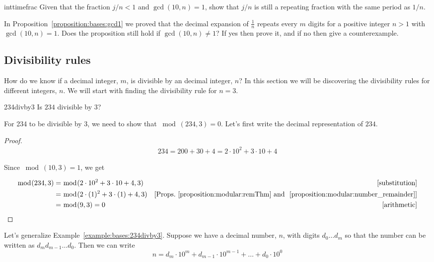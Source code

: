 \begin{exercise}{inttimefrac}
 Given that the fraction $j/n < 1$ and $\gcd(10,n)=1$, show that $j/n$  is still a repeating fraction with the same period as $1/n$.
\end{exercise}

\begin{exercise}{}
In Proposition~\ref{proposition:bases:gcd1} we proved that the decimal expansion of $\frac{1}{n}$ repeats every $m$ digits for a positive integer $n>1$ with 
$\gcd(10,n)=1$. Does the proposition still hold if $\gcd(10,n)\neq 1$? If yes then prove it, and  if no then give a counterexample.
\end{exercise}
\subsection{Divisibility rules}

How do we know if a decimal integer, $m$, is divisible by an decimal integer, $n$? In this section we will be discovering the divisibility rules for different integers, $n$. We will start with finding the divisibility rule for $n=3$.

\begin{example}{234divby3}
Is $234$ divisible by $3$?
\end{example}
For 234 to be divisible by 3, we need to show that $\bmod(234,3)=0$. Let's first write the decimal representation of $234$. 
 
\begin{proof}

\begin{align*}
234=200+30+4=2\cdot 10^{2}+3\cdot 10+4
\end{align*}

Since $\bmod(10,3)=1$, we get 

\begin{align*}
\bmod(234,3)&=\bmod(2 \cdot 10^{2}+3 \cdot 10+4,3) & [\textrm{substitution}]\\
&=\bmod(2\cdot(1)^2+3\cdot(1)+4,3) & [\textrm{Props.~\ref{proposition:modular:remThm} and ~\ref{proposition:modular:number_remainder}}]\\
&=\bmod(9,3)=0 & [\textrm{arithmetic}]
\end{align*}
\end{proof}

Let's generalize Example~\ref{example:bases:234divby3}. Suppose we have a decimal number, $n$, with digits $d_{0}\dots d_{m}$  so that the number can be written as $d_{m}d_{m-1}\dots d_{0}$. Then we can write 
\begin{equation*}
n=d_{m}\cdot 10^{m}+d_{m-1}\cdot 10^{m-1}+\dots +d_{0}\cdot 10^{0}
\end{equation*}

